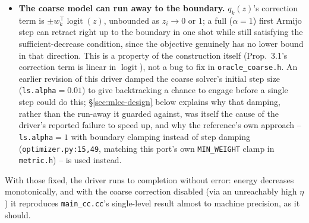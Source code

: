\documentclass[11pt]{article}
\begin{document}
\begin{itemize}[nosep]
        in \texttt{oracle\_coarse\_base.h} says as much -- but had never written it down
        where a new oracle would be written.
  \item \textbf{The coarse model can run away to the boundary.} $q_k(z)$'s correction term
        is $\pm w_k^\top\operatorname{logit}(z)$, unbounded as $z_i\to0$ or $1$; a full
        ($\alpha=1$) first Armijo step can retract right up to the boundary in one shot
        while still satisfying the sufficient-decrease condition, since the objective
        genuinely has no lower bound in that direction. This is a property of the
        construction itself (Prop.~3.1's correction term is linear in $\operatorname{logit}$),
        not a bug to fix in \texttt{oracle\_coarse.h}. An earlier revision of this driver
        damped the coarse solver's initial step size (\texttt{ls.alpha}$=0.01$) to give
        backtracking a chance to engage before a single step could do this; \S\ref{sec:mlcc-design}
        below explains why that damping, rather than the run-away it guarded against, was
        itself the cause of the driver's reported failure to speed up, and why the reference's
        own approach -- \texttt{ls.alpha}$=1$ with boundary clamping instead of step damping
        (\texttt{optimizer.py:15,49}, matching this port's own \texttt{MIN\_WEIGHT} clamp in
        \texttt{metric.h}) -- is used instead.
\end{itemize}

With those fixed, the driver runs to completion without error: energy decreases
monotonically, and with the coarse correction disabled (via an unreachably high $\eta$) it
reproduces \texttt{main\_cc.cc}'s single-level result almost to machine precision, as it
should.
\end{document}
